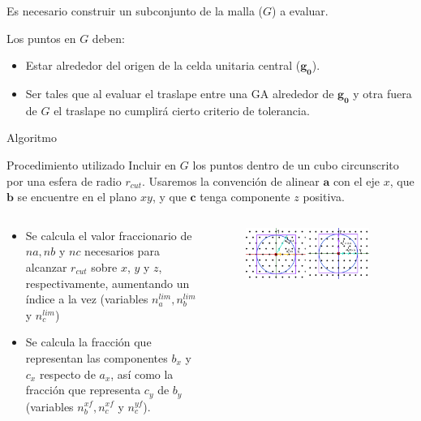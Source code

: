 \documentclass[dvisvgm,11pt,aspectratio=169]{beamer}
\begin{document}
\begin{frame}
Es necesario construir un subconjunto de la malla ($G$) a evaluar.

Los puntos en $G$ deben:
\begin{itemize}
	\item Estar alrededor del origen de la celda unitaria central ($\mathbf{g_0}$).
	\item Ser tales que al evaluar el traslape entre una GA alrededor de $\mathbf{g_0}$ y otra fuera de $G$ el traslape no cumplirá cierto criterio de tolerancia.
\end{itemize} 
\end{frame}

\begin{frame}{Algoritmo}
\begin{block}{Procedimiento utilizado}
Incluir en $G$ los puntos dentro de un cubo circunscrito por una esfera de radio $r_{cut}$. Usaremos la convención de alinear $\mathbf{a}$ con el eje $x$, que $\mathbf{b}$ se encuentre en el plano $xy$, y que $\mathbf{c}$ tenga componente $z$ positiva. 
\end{block}
\begin{columns}
\begin{column}{0.6\textwidth}
\begin{itemize}
\item Se calcula el valor fraccionario de $na, nb$ y $nc$ necesarios para alcanzar $r_{cut}$ sobre $x$, $y$ y $z$, respectivamente, aumentando un índice a la vez (variables $n_a^{lim}, n_b^{lim}$ y $n_c^{lim}$)
\item Se calcula la fracción que representan las componentes $b_x$ y $c_x$ respecto de $a_x$, así como la fracción que representa $c_y$ de $b_y$ (variables $n_b^{xf}, n_c^{xf}$ y $n_c^{yf}$).
\end{itemize} 
\end{column}
\begin{column}{0.39\textwidth}
\begin{figure}
\includegraphics[width=0.9\textwidth]{img/Grid1_1}

\end{figure}
\end{column}
\end{columns}
\end{frame}
\end{document}
